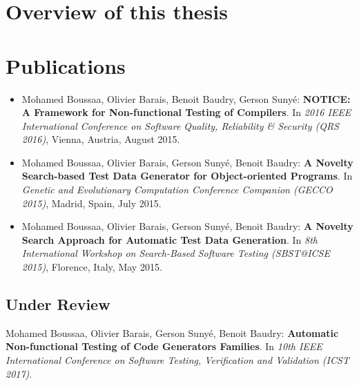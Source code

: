 \section*{Overview of this thesis}

\section*{Publications}

\begin{itemize}

	\item Mohamed Boussaa, Olivier Barais, Benoit Baudry, Gerson Sunyé:
	\textbf{NOTICE: A Framework for Non-functional Testing of Compilers}. In 
	\textit{2016 IEEE International Conference on Software Quality, Reliability \& Security (QRS 2016)}, Vienna, Austria, August 2015.
	
	\item Mohamed Boussaa, Olivier Barais, Gerson Sunyé, Benoit Baudry:
	\textbf{A Novelty Search-based Test Data Generator for Object-oriented Programs}. In \textit{Genetic and Evolutionary Computation Conference Companion (GECCO 2015)}, Madrid, Spain, July 2015.
	
	\item Mohamed Boussaa, Olivier Barais, Gerson Sunyé, Benoit Baudry:
	\textbf{A Novelty Search Approach for Automatic Test Data Generation}. In
	\textit{8th International Workshop on Search-Based Software Testing (SBST@ICSE 2015)}, Florence, Italy, May 2015.

	
	
\end{itemize}

\subsection*{Under Review}
	Mohamed Boussaa, Olivier Barais, Gerson Sunyé, Benoit Baudry:
	\textbf{Automatic Non-functional Testing of Code Generators Families}. In
	\textit{10th IEEE International Conference on Software Testing, Verification and Validation (ICST 2017)}.
